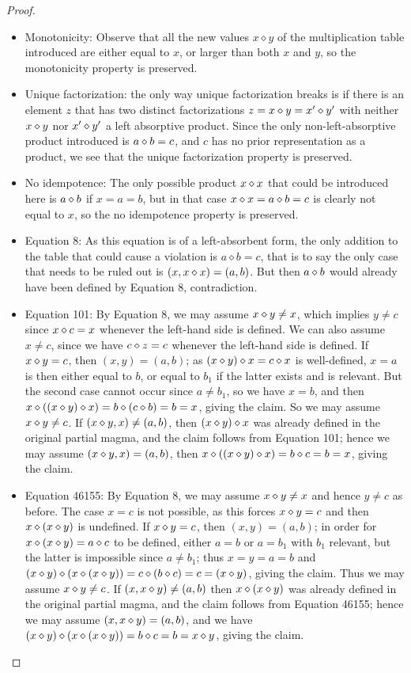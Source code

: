 \begin{proof}
\begin{itemize}
  \item Monotonicity: Observe that all the new values $x \diamond y$ of the multiplication table introduced are either equal to $x$, or larger than both $x$ and $y$, so the monotonicity property is preserved.
  \item Unique factorization: the only way unique factorization breaks is if there is an element $z$ that has two distinct factorizations $z = x \diamond y = x' \diamond y'$ with neither $x \diamond y$ nor $x' \diamond y'$ a left absorptive product.  Since the only non-left-absorptive product introduced is $a \diamond b = c$, and $c$ has no prior representation as a product, we see that the unique factorization property is preserved.
  \item No idempotence: The only possible product $x \diamond x$ that could be introduced here is $a \diamond b$ if $x=a=b$, but in that case $x \diamond x = a \diamond b = c$ is clearly not equal to $x$, so the no idempotence property is preserved.
  \item Equation 8: As this equation is of a left-absorbent form, the only addition to the table that could cause a violation is $a \diamond b = c$, that is to say the only case that needs to be ruled out is $(x, x \diamond x) = (a,b)$.  But then $a \diamond b$ would already have been defined by Equation 8, contradiction.
  \item Equation 101: By Equation 8, we may assume $x \diamond y \neq x$, which implies $y \neq c$ since $x \diamond c = x$ whenever the left-hand side is defined.  We can also assume $x \neq c$, since we have $c \diamond z = c$ whenever the left-hand side is defined.  If $x \diamond y = c$, then $(x,y) = (a,b)$; as $(x \diamond y) \diamond x = c \diamond x$ is well-defined, $x=a$ is then either equal to $b$, or equal to $b_1$ if the latter exists and is relevant.  But the second case cannot occur since $a \neq b_1$, so we have $x = b$, and then $x \diamond ((x \diamond y) \diamond x) = b \diamond (c \diamond b) = b = x$, giving the claim.  So we may assume $x \diamond y \neq c$.  If $(x \diamond y, x) \neq (a,b)$, then $(x \diamond y) \diamond x$ was already defined in the original partial magma, and the claim follows from Equation 101; hence we may assume $(x \diamond y, x) = (a,b)$, then $x \diamond ((x \diamond y) \diamond x) = b \diamond c = b = x$, giving the claim.
  \item Equation 46155: By Equation 8, we may assume $x \diamond y \neq x$ and hence $y \neq c$ as before.  The case $x=c$ is not possible, as this forces $x \diamond y = c$ and then $x \diamond (x \diamond y)$ is undefined.  If $x \diamond y = c$, then $(x,y) = (a,b)$; in order for $x \diamond (x \diamond y) = a \diamond c$ to be defined, either $a=b$ or $a=b_1$ with $b_1$ relevant, but the latter is impossible since $a \neq b_1$; thus $x=y=a=b$ and $(x \diamond y) \diamond (x \diamond (x \diamond y)) = c \diamond (b \diamond c) = c = (x \diamond y)$, giving the claim.  Thus we may assume $x \diamond y \neq c$.  If $(x, x \diamond y) \neq (a,b)$ then $x \diamond (x \diamond y)$ was already defined in the original partial magma, and the claim follows from Equation 46155; hence we may assume $(x, x \diamond y) = (a,b)$, and we have $(x \diamond y) \diamond (x \diamond (x \diamond y)) = b \diamond c = b = x \diamond y$, giving the claim.

\end{itemize}
\end{proof}
